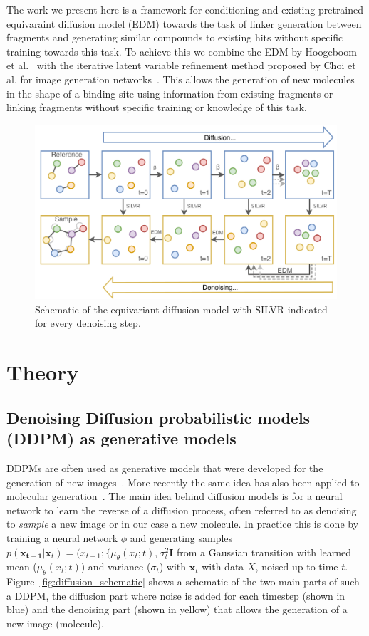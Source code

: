 \documentclass[journal=jacsat,manuscript=article]{achemso}
\begin{document}
The work we present here is a framework for conditioning and existing pretrained equivaraint diffusion model (EDM) towards the task of linker generation between fragments and generating similar compounds to existing hits without specific training towards this task.  To achieve this we combine the EDM by Hoogeboom et al.~\cite{hoogeboom2022equivariant} with the iterative latent variable refinement method proposed by Choi et al. for image generation networks~\cite{choi2021ilvr}. This allows the generation of new molecules in the shape of a binding site using information from existing fragments or linking fragments without specific training or knowledge of this task. 
\begin{figure}
    \centering
    \includegraphics[width=\textwidth]{paper/Figures/Fig1/Schematic.png}
    \caption{Schematic of the equivariant diffusion model with  SILVR indicated for every denoising step.}
    \label{fig:schematic}
\end{figure}


\section{Theory}
\label{sec:theory}
\subsection*{Denoising Diffusion probabilistic models (DDPM) as generative models}
DDPMs are often used as generative models that were developed for the generation of new images~\cite{sohl-dickstein2015deep, ho2020denoising, nichol2021improved}. More recently the same idea has also been applied to molecular generation~\cite{hoogeboom2022equivariant}. The main idea behind diffusion models is for a neural network to learn the reverse of a diffusion process, often referred to as denoising to \textit{sample} a new image or in our case a new molecule. In practice this is done by training a neural network $\phi$ and generating samples $p(\mathbf{x_{t-1}}|\mathbf{x}_t)=\mathcal(x_{t-1}; \{\mu_{\theta}(x_t;t), \sigma_t^2\mathbf{I}$ from  a Gaussian transition with learned mean ($\mu_{\theta}(x_t;t)$) and variance ($\sigma_t$) with $\mathbf{x}_t$ with data $X$, noised up to time $t$.  Figure~\ref{fig:diffusion_schematic} shows a schematic of the two main parts of such a DDPM, the diffusion part where noise is added for each timestep (shown in blue) and the denoising part (shown in yellow) that allows the generation of a new image (molecule).
\end{document}
